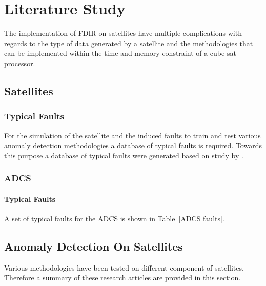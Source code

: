 \chapter{Literature Study}
\vspace{-2em}
\minitoc

\startarabicpagenumbering %


The implementation of FDIR on satellites have multiple complications with regards to the type of data generated by a satellite and the methodologies that can be implemented within the time and memory constraint of a cube-sat processor.

\section{Satellites}

\subsection{Typical Faults}
For the simulation of the satellite and the induced faults to train and test various anomaly detection methodologies a database of typical faults is required. Towards this purpose a database of typical faults were generated based on study by \textcite{tafazoli2009study}. 

\subsection{ADCS}

\subsubsection{Typical Faults}
A set of typical faults for the ADCS is shown in Table~\ref{ADCS faults}.


\section{Anomaly Detection On Satellites}
Various methodologies have been tested on different component of satellites. Therefore a summary of these research articles are provided in this section.

